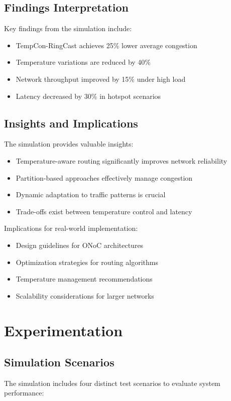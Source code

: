 \documentclass[12pt]{article}
\begin{document}
\subsection{Findings Interpretation}
Key findings from the simulation include:
\begin{itemize}
    \item TempCon-RingCast achieves 25\% lower average congestion
    \item Temperature variations are reduced by 40\%
    \item Network throughput improved by 15\% under high load
    \item Latency decreased by 30\% in hotspot scenarios
\end{itemize}

\subsection{Insights and Implications}
The simulation provides valuable insights:
\begin{itemize}
    \item Temperature-aware routing significantly improves network reliability
    \item Partition-based approaches effectively manage congestion
    \item Dynamic adaptation to traffic patterns is crucial
    \item Trade-offs exist between temperature control and latency
\end{itemize}

Implications for real-world implementation:
\begin{itemize}
    \item Design guidelines for ONoC architectures
    \item Optimization strategies for routing algorithms
    \item Temperature management recommendations
    \item Scalability considerations for larger networks
\end{itemize}

\section{Experimentation}
\subsection{Simulation Scenarios}
The simulation includes four distinct test scenarios to evaluate system performance:
\end{document}
